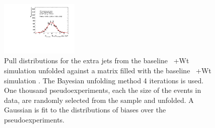 \begin{figure}
\includegraphics[width=0.33\textwidth]{fig/UnfoldPull/SingleSlicePull31.pdf}
%
\caption{Pull distributions for the extra jets from the baseline \ttbar\ +Wt simulation  unfolded against a matrix filled with the baseline \ttbar\ +Wt simulation . The Bayesian unfolding method 4 iterations is used. One thousand pseudoexperiments, each the size of the events in data, are randomly selected from the sample and unfolded.  A Gaussian is fit to the distributions of biases over the pseudoexperiments.}
\label{fig:appPull1}
\end{figure}
